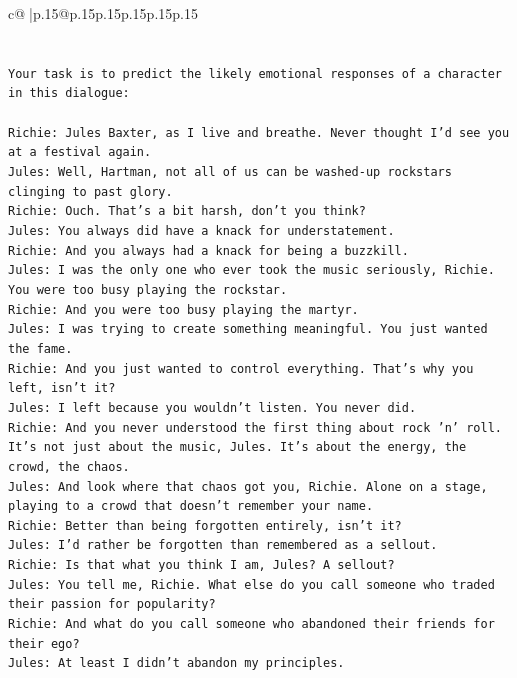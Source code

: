 \documentclass{article}
\begin{document}
{\begin{supertabular}{c@{$\;$}|p{.15\linewidth}@{}p{.15\linewidth}p{.15\linewidth}p{.15\linewidth}p{.15\linewidth}p{.15\linewidth}}
{{{\\ 
\\ 
\\ 
\texttt{Your task is to predict the likely emotional responses of a character in this dialogue:} \\
\\ 
\texttt{Richie: Jules Baxter, as I live and breathe. Never thought I'd see you at a festival again.} \\
\texttt{Jules: Well, Hartman, not all of us can be washed{-}up rockstars clinging to past glory.} \\
\texttt{Richie: Ouch. That's a bit harsh, don't you think?} \\
\texttt{Jules: You always did have a knack for understatement.} \\
\texttt{Richie: And you always had a knack for being a buzzkill. } \\
\texttt{Jules: I was the only one who ever took the music seriously, Richie. You were too busy playing the rockstar.} \\
\texttt{Richie: And you were too busy playing the martyr. } \\
\texttt{Jules: I was trying to create something meaningful. You just wanted the fame.} \\
\texttt{Richie: And you just wanted to control everything. That's why you left, isn't it?} \\
\texttt{Jules: I left because you wouldn’t listen. You never did.} \\
\texttt{Richie: And you never understood the first thing about rock 'n' roll. It's not just about the music, Jules. It's about the energy, the crowd, the chaos.} \\
\texttt{Jules: And look where that chaos got you, Richie. Alone on a stage, playing to a crowd that doesn't remember your name.} \\
\texttt{Richie: Better than being forgotten entirely, isn't it?} \\
\texttt{Jules: I'd rather be forgotten than remembered as a sellout.} \\
\texttt{Richie: Is that what you think I am, Jules? A sellout?} \\
\texttt{Jules: You tell me, Richie. What else do you call someone who traded their passion for popularity?} \\
\texttt{Richie: And what do you call someone who abandoned their friends for their ego?} \\
\texttt{Jules: At least I didn't abandon my principles.} \\
}}}
\end{supertabular}}
\end{document}

